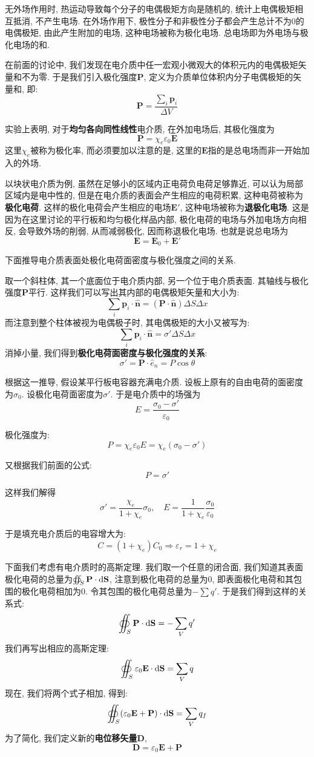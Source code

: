 无外场作用时, 热运动导致每个分子的电偶极矩方向是随机的, 统计上电偶极矩相互抵消, 不产生电场. 在外场作用下, 极性分子和非极性分子都会产生总计不为0的电偶极矩, 由此产生附加的电场, 这种电场被称为极化电场. 总电场即为外电场与极化电场的和.

在前面的讨论中, 我们发现在电介质中任一宏观小微观大的体积元内的电偶极矩矢量和不为零. 于是我们引入极化强度$\mathbf{P}$, 定义为介质单位体积内分子电偶极矩的矢量和, 即:
\[
\mathbf{P}=\frac{\sum_i \mathbf{p}_i}{\Delta V}
\]

实验上表明, 对于\textbf{均匀各向同性线性}电介质, 在外加电场后, 其极化强度为
\[
\mathbf{P}=\chi_e \varepsilon_0 \mathbf{E}
\]
这里$\chi_e$被称为极化率, 而必须要加以注意的是, 这里的$\mathbf{E}$指的是总电场而非一开始加入的外场.

以块状电介质为例, 虽然在足够小的区域内正电荷负电荷足够靠近, 可以认为局部区域内是电中性的, 但是在电介质的表面会产生相应的电荷积累, 这种电荷被称为\textbf{极化电荷}. 这样的极化电荷会产生相应的电场$\mathbf{E'}$, 这种电场被称为\textbf{退极化电场}. 这是因为在这里讨论的平行板和均匀极化样品内部, 极化电荷的电场与外加电场方向相反, 会导致外场的削弱, 从而减弱极化, 因而称退极化电场. 也就是说总电场为
\[
\mathbf{E}=\mathbf{E}_0+\mathbf{E'}
\]

下面推导电介质表面处极化电荷面密度与极化强度之间的关系.

取一个斜柱体, 其一个底面位于电介质内部, 另一个位于电介质表面. 其轴线与极化强度$\mathbf{P}$平行. 这样我们可以写出其内部的电偶极矩矢量和大小为:
\[
\sum_i\mathbf p_i\cdot\hat{\mathbf n}=(\mathbf P\cdot\hat{\mathbf n})\Delta S\Delta x
\]
而注意到整个柱体被视为电偶极子时, 其电偶极矩的大小又被写为:
\[
\sum_i\mathbf p_i\cdot\hat{\mathbf n} = \sigma' \Delta S \Delta x
\]
消掉小量, 我们得到\textbf{极化电荷面密度与极化强度的关系}:
\[
\sigma' = \mathbf{P} \cdot \hat{e}_n = P\cos\theta
\]

根据这一推导, 假设某平行板电容器充满电介质. 设板上原有的自由电荷的面密度为$\sigma_0$. 设极化电荷面密度为$\sigma'$. 于是电介质中的场强为
\[
E=\frac{\sigma_0-\sigma'}{\varepsilon_0}
\]

极化强度为:
\[
P=\chi_e\varepsilon_0 E=\chi_e(\sigma_0-\sigma')
\]

又根据我们前面的公式:
\[
P=\sigma'
\]

这样我们解得
\[
\sigma' = \frac{\chi_e}{1+\chi_e}\sigma_0 ,\quad E= \frac{1}{1+\chi_e} \frac{\sigma_0}{\varepsilon_0}
\]

于是填充电介质后的电容增大为:
\[
C=(1+\chi_e)C_0 \Rightarrow \varepsilon_r = 1+\chi_e
\]

下面我们考虑有电介质时的高斯定理. 我们取一个任意的闭合面, 我们知道其表面极化电荷的总量为$\oiint_S \mathbf{P} \cdot \mathop{}\!\mathrm{d} \mathbf{S}$, 注意到极化电荷的总量为0, 即表面极化电荷和其包围的极化电荷相加为0. 令其包围的极化电荷总量为$-\sum q'$. 于是我们得到这样的关系式:
\[
\oiint_S \mathbf{P} \cdot \mathop{}\!\mathrm{d} \mathbf{S}  = -\sum_V q'
\]
我们再写出相应的高斯定理:
\[
\oiint_S \varepsilon_0 \mathbf{E} \cdot \mathop{}\!\mathrm{d} \mathbf{S}  = \sum_V q
\]
现在, 我们将两个式子相加, 得到:
\[
\oiint_S (\varepsilon_0 \mathbf{E} + \mathbf{P}) \cdot \mathop{}\!\mathrm{d} \mathbf{S} = \sum_V q_f
\]
为了简化, 我们定义新的\textbf{电位移矢量}$\mathbf{D}$,
\[
\mathbf{D} = \varepsilon_0\mathbf{E}+\mathbf{P}
\]

